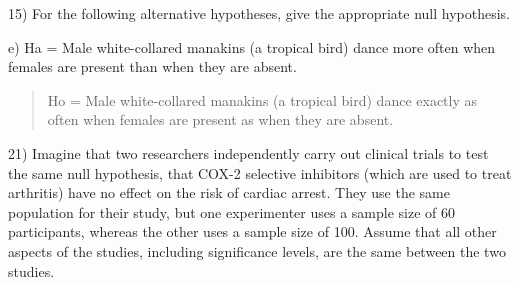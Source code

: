 \documentclass[ignorenonframetext,]{beamer}
\begin{document}
\begin{frame}{15) For the following alternative hypotheses, give the
appropriate null hypothesis.}
\begin{block}{e) Ha = Male white-collared manakins (a tropical bird)
dance more often when females are present than when they are absent.}
\begin{quote}
Ho = Male white-collared manakins (a tropical bird) dance exactly as
often when females are present as when they are absent.
\end{quote}

\end{block}

\begin{block}{21) Imagine that two researchers independently carry out
clinical trials to test the same null hypothesis, that COX-2 selective
inhibitors (which are used to treat arthritis) have no effect on the
risk of cardiac arrest. They use the same population for their study,
but one experimenter uses a sample size of 60 participants, whereas the
other uses a sample size of 100. Assume that all other aspects of the
studies, including significance levels, are the same between the two
studies.}

\end{block}

\end{frame}
\end{document}

